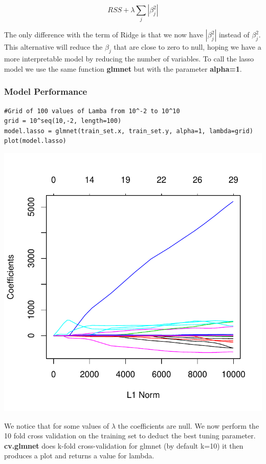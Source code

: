 \documentclass[]{report}
\begin{document}
\begin{equation} \label{eq2}
RSS + \lambda \sum_{j}{|\beta_{j}^{2}|}
\end{equation}	

The only difference with the term of Ridge is that we now have $|\beta_{j}^{2}|$ instead of $\beta_{j}^{2}$. This alternative will reduce the $\beta_{j}$ that are close to zero to null, hoping we have a more interpretable model by reducing the number of variables. To call the lasso model we use the same function \textbf{glmnet} but with the parameter \textbf{alpha=1}.

\subsubsection{Model Performance}
\begin{lstlisting}
#Grid of 100 values of Lamba from 10^-2 to 10^10
grid = 10^seq(10,-2, length=100)
model.lasso = glmnet(train_set.x, train_set.y, alpha=1, lambda=grid)
plot(model.lasso)
\end{lstlisting}

\begin{center}
	\includegraphics[width=0.8\linewidth]{Figures/lasso_model.pdf}
\end{center}

We notice that for some values of $\lambda$ the coefficients are null. We now perform the 10 fold cross validation on the training set to deduct the best tuning parameter. \textbf{cv.glmnet} does k-fold cross-validation for glmnet (by default k=10) it then  produces a plot and returns a value for lambda.
\end{document}
